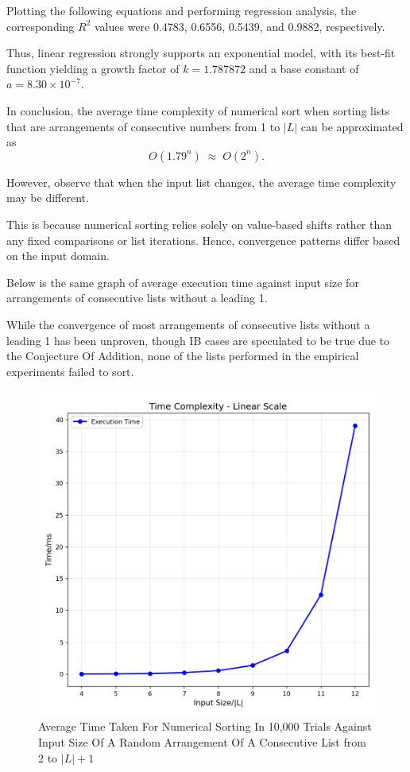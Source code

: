 \documentclass[12pt]{article}
\begin{document}
Plotting the following equations and performing regression analysis, the corresponding $R^2$ values were 0.4783, 0.6556, 0.5439, and 0.9882, respectively.

Thus, linear regression strongly supports an exponential model, with its best-fit function yielding a growth factor of $k = 1.787872$ and a base constant of $a = 8.30 \times 10^{-7}$.

In conclusion, the average time complexity of numerical sort when sorting lists that are arrangements of consecutive numbers from 1 to $|L|$ can be approximated as 
\[
O(1.79^n) \;\approx\; O(2^n).
\]

However, observe that when the input list changes, the average time complexity may be different.

This is because numerical sorting relies solely on value-based shifts rather than any fixed comparisons or list iterations. Hence, convergence patterns differ based on the input domain.

Below is the same graph of average execution time against input size for arrangements of consecutive lists without a leading 1.

While the convergence of most arrangements of consecutive lists without a leading 1 has been unproven, though IB cases are speculated to be true due to the Conjecture Of Addition, none of the lists performed in the empirical experiments failed to sort.

\begin{figure}[H]
    \centering
    \includegraphics[width=0.75\linewidth]{Time_Complexity_2.png}
    \caption{Average Time Taken For Numerical Sorting In 10,000 Trials Against Input Size Of A Random Arrangement Of A Consecutive List from 2 to $|L|+1$}
    \label{fig:placeholder}
\end{figure}
\end{document}
